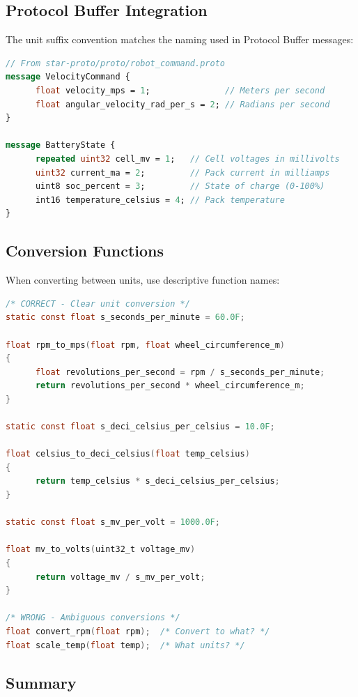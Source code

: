 \subsection{Protocol Buffer Integration}

The unit suffix convention matches the naming used in Protocol Buffer messages:

\begin{lstlisting}[language=Protobuf]
// From star-proto/proto/robot_command.proto
message VelocityCommand {
      float velocity_mps = 1;               // Meters per second
      float angular_velocity_rad_per_s = 2; // Radians per second
}

message BatteryState {
      repeated uint32 cell_mv = 1;   // Cell voltages in millivolts
      uint32 current_ma = 2;         // Pack current in milliamps
      uint8 soc_percent = 3;         // State of charge (0-100%)
      int16 temperature_celsius = 4; // Pack temperature
}


\end{lstlisting}
\subsection{Conversion Functions}

When converting between units, use descriptive function names:

\begin{lstlisting}[language=C]
/* CORRECT - Clear unit conversion */
static const float s_seconds_per_minute = 60.0F;

float rpm_to_mps(float rpm, float wheel_circumference_m)
{
      float revolutions_per_second = rpm / s_seconds_per_minute;
      return revolutions_per_second * wheel_circumference_m;
}

static const float s_deci_celsius_per_celsius = 10.0F;

float celsius_to_deci_celsius(float temp_celsius)
{
      return temp_celsius * s_deci_celsius_per_celsius;
}

static const float s_mv_per_volt = 1000.0F;

float mv_to_volts(uint32_t voltage_mv)
{
      return voltage_mv / s_mv_per_volt;
}

/* WRONG - Ambiguous conversions */
float convert_rpm(float rpm);  /* Convert to what? */
float scale_temp(float temp);  /* What units? */


\end{lstlisting}
\subsection{Summary}

